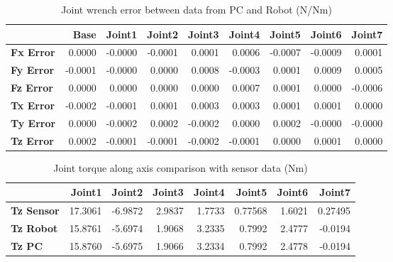 \begin{table}[h!]
	\centering
	\caption{Joint wrench error between data from PC and Robot (N/Nm)}
	\label{wrech_Error_Pose7}
	\begin{tabular}{|l|r|r|r|r|r|r|r|r|}
		\hline
		\textbf{}  & \textbf{Base} & \textbf{Joint1}  & \textbf{Joint2}  & \textbf{Joint3}  & \textbf{Joint4}  & \textbf{Joint5}  & \textbf{Joint6}  & \textbf{Joint7} \\ \hline
		\textbf{Fx Error}  & 0.0000        & -0.0000        & -0.0001        & 0.0001        & 0.0006        & -0.0007        & -0.0009        & 0.0001 \\ \hline
		\textbf{Fy Error}  & -0.0001        & -0.0000        & 0.0000        & 0.0008        & -0.0003        & 0.0001        & 0.0009        & 0.0005 \\ \hline
		\textbf{Fz Error}  & 0.0000        & 0.0000        & 0.0000        & 0.0000        & 0.0007        & 0.0001        & 0.0000        & -0.0006 \\ \hline
		\textbf{Tx Error}  & -0.0002        & -0.0001        & 0.0001        & 0.0003        & 0.0003        & 0.0001        & 0.0001        & 0.0000 \\ \hline
		\textbf{Ty Error}  & 0.0000        & -0.0002        & 0.0002        & -0.0002        & 0.0000        & 0.0002        & -0.0000        & -0.0000 \\ \hline
		\textbf{Tz Error}  & 0.0002        & -0.0001        & -0.0001        & -0.0002        & -0.0001        & 0.0000        & 0.0001        & 0.0000 \\ \hline
	\end{tabular}
\end{table}

\begin{table}[h!]
	\centering
	\caption{Joint torque along axis comparison with sensor data (Nm)}
	\label{wrech_Sensor_Pose7}
	\begin{tabular}{|l|r|r|r|r|r|r|r|}
		\hline
		\textbf{} & \textbf{Joint1} & \textbf{Joint2} & \textbf{Joint3} & \textbf{Joint4} & \textbf{Joint5} & \textbf{Joint6} & \textbf{Joint7} \\ \hline
		\textbf{Tz Sensor}  & 17.3061           & -6.9872           & 2.9837            & 1.7733           & 0.77568           & 1.6021           & 0.27495           \\ \hline
		\textbf{Tz Robot}  	& 15.8761           & -5.6974           & 1.9068            & 3.2335           & 0.7992           & 2.4777           & -0.0194           \\ \hline
		\textbf{Tz PC}  	& 15.8760           & -5.6975           & 1.9066            & 3.2334           & 0.7992           & 2.4778           & -0.0194           \\ \hline
	\end{tabular}
\end{table}

